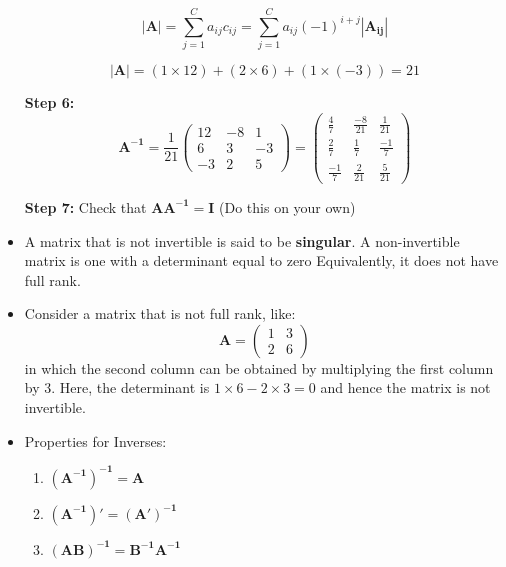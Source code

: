 \documentclass[11pt]{article}
\theoremstyle{definition}
\theoremstyle{remark}
\begin{document}
\begin{itemize}
$$
|\mathbf{A}| = \sum_{j=1}^{C} a_{ij}c_{ij} = \sum_{j=1}^{C} a_{ij}(-1)^{i+j}| \mathbf{A_{ij}}|
$$

$$
|\mathbf{A}| = (1 \times 12) + (2 \times 6) + (1 \times (-3)) = 21
$$

\textbf{Step 6:}
$$
\mathbf{A^{-1}}=\frac{1}{21} 
\begin{pmatrix}
12&-8&1 \\
6&3&-3 \\
-3&2&5
\end{pmatrix}
=
\begin{pmatrix}
\frac{4}{7}&\frac{-8}{21}&\frac{1}{21} \\
\frac{2}{7}&\frac{1}{7}&\frac{-1}{7} \\
\frac{-1}{7}&\frac{2}{21}&\frac{5}{21}
\end{pmatrix}
$$

\textbf{Step 7:}
Check that $\mathbf{AA^{-1}=I}$
\newline
(Do this on your own)
\newline

\item A matrix that is not invertible is said to be \textbf{singular}. A non-invertible matrix is one with a determinant equal to zero Equivalently, it does not have full rank. 
\item Consider a matrix that is not full rank, like:
$$
\mathbf{A} = 
\begin{pmatrix}
1&3 \\
2&6
\end{pmatrix}
$$
in which the second column can be obtained by multiplying the first column by 3. Here, the determinant is $1 \times 6 - 2 \times 3 = 0$ and hence the matrix is not invertible.
\item Properties for Inverses:
\begin{enumerate}
\item $\mathbf{(A^{-1})^{-1} = A}$
\item $\mathbf{(A^{-1})' = (A')^{-1}}$
\item $\mathbf{(AB)^{-1} = B^{-1}A^{-1}}$
\end{enumerate}
\end{itemize}
\newpage
\end{document}
